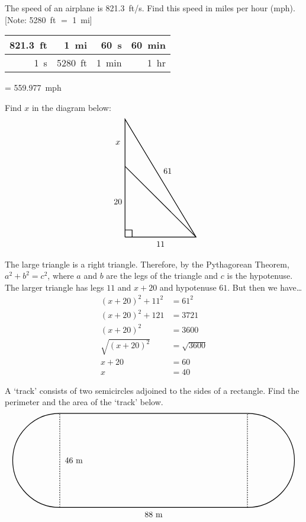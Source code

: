 \documentclass[11pt,letterpaper]{article}
\begin{document}

 The speed of an airplane is 821.3~ft/s. Find this speed in miles per hour (mph). [Note: 5280~ft $=$ 1~mi] \pspace

\sol 
	\begin{table}[!ht]
	\centering
	\begin{tabular}{r|r|r|r}
	821.3~ft & 1~mi & 60~s & 60~min \\ \hline
	1~s	     & 5280~ft & 1~min & 1~hr
	\end{tabular}
	= 559.977~mph
	\end{table}



\newpage



 Find $x$ in the diagram below:
	\[
	\begin{tikzpicture}
	\draw[line width=0.03cm] (0,0) -- (0,5) -- (3,0) -- (0,0);
	\draw[line width=0.03cm] (0,0.3) -- (0.3,0.3) -- (0.3,0);
	\draw[line width=0.03cm] (3,0) -- (0,3);
	\node at (1.5,-0.3) {$11$};
	\node at (-0.3,1.5) {$20$};
	\node at (1.8,2.8) {$61$};
	\node at (-0.3,4.0) {$x$};
	\end{tikzpicture}
	\]

\sol The large triangle is a right triangle. Therefore, by the Pythagorean Theorem, $a^2 + b^2= c^2$, where $a$ and $b$ are the legs of the triangle and $c$ is the hypotenuse. The larger triangle has legs $11$ and $x + 20$ and hypotenuse $61$. But then we have\dots
	\[
	\begin{aligned}
	(x + 20)^2 + 11^2&= 61^2 \\[0.3cm]
	(x + 20)^2 + 121&= 3721 \\[0.3cm]
	(x + 20)^2&= 3600 \\[0.3cm]
	\sqrt{(x + 20)^2}&= \sqrt{3600} \\[0.3cm]
	x + 20&= 60 \\[0.3cm]
	x&= 40
	\end{aligned}
	\]



\newpage



 A `track' consists of two semicircles adjoined to the sides of a rectangle. Find the perimeter and the area of the `track' below.
	\[
	\begin{tikzpicture}
	\draw[line width=0.03cm] (0,0) -- (8,0);
	\draw[line width=0.03cm] (0,4) -- (8,4);
	\draw[line width=0.03cm] (8,4) -- (8,0) arc(-90:90:2);
	\draw[line width=0.03cm] (0,0) -- (0,4) arc(90:270:2);
	\draw[line width=0.04cm,white] (0,0.015) -- (0,3.985);
	\draw[line width=0.03cm,dotted] (0,0.015) -- (0,3.985);
	\draw[line width=0.04cm,white] (8,0.015) -- (8,3.985);
	\draw[line width=0.03cm,dotted] (8,0.015) -- (8,3.985);
	\node at (4,-0.3) {$88$~m};
	\node at (0.6,2) {$46$~m};
	\end{tikzpicture}
	\] \pspace
\end{document}
